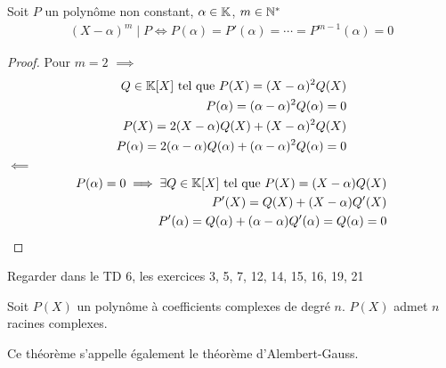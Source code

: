 \begin{graybox}
\begin{theoreme}
Soit $P$ un polynôme non constant, $\alpha \in \mathbb{K}$, $m \in \mathbb{N}^*$
\begin{align*}
(X - \alpha)^m \mid P \iff P(\alpha) = P'(\alpha) = \cdots = P^{m-1}(\alpha) = 0
\end{align*}
\end{theoreme}
\end{graybox}

\begin{proof} Pour $m = 2$
$\implies$ 
\begin{align*}
Q \in \mathbb{K} [X] \text{ tel que } P(X) = (X - \alpha)^2 Q(X) \\
P(\alpha) = (\alpha - \alpha)^2 Q(\alpha) = 0 \\
P(X) = 2(X - \alpha) Q(X) + (X - \alpha)^2 Q(X) \\
P(\alpha) = 2 (\alpha - \alpha) Q(\alpha) + (\alpha - \alpha)^2 Q(\alpha) = 0
\end{align*}
$\impliedby$
\begin{align*}
P(\alpha) = 0 \implies \exists Q \in \mathbb{K}[X] \text{ tel que } P(X) = (X - \alpha) Q(X) \\
P'(X) = Q(X) + (X - \alpha)Q'(X) \\
P'(\alpha) = Q(\alpha) + (\alpha - \alpha) Q'(\alpha) = Q(\alpha) = 0
\end{align*}
\end{proof}

\begin{remarque}
Regarder dans le TD 6, les exercices 3, 5, 7, 12, 14, 15, 16, 19, 21
\end{remarque}

\begin{graybox}
\begin{theoreme}
Soit $P(X)$ un polynôme à coefficients complexes de degré $n$. $P(X)$ admet $n$ racines complexes. 
\end{theoreme}
\end{graybox}

\begin{remarque}
Ce théorème s'appelle également le théorème d'Alembert-Gauss.
\end{remarque}
